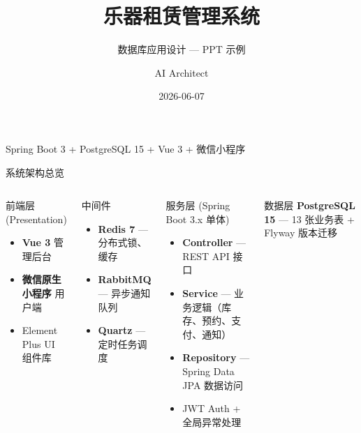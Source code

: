 \documentclass[aspectratio=169,10pt]{beamer}
\title{乐器租赁管理系统}
\subtitle{数据库应用设计 — PPT 示例}
\author{AI Architect}
\date{2026-06-07}
\newcommand{\pos}[1]{\textcolor{positive}{#1}}
\begin{document}
\begin{frame}
  \titlepage
  \vspace{-8pt}
  \begin{center}
    {\small Spring Boot 3 + PostgreSQL 15 + Vue 3 + 微信小程序}
  \end{center}
\end{frame}

\begin{frame}{系统架构总览}
  \vspace{4pt}
  \begin{columns}[T]
    \begin{block}{前端层 (Presentation)}
      \begin{itemize}
        \item \textbf{Vue 3} 管理后台
        \item \textbf{微信原生小程序} 用户端
        \item Element Plus UI 组件库
      \end{itemize}
    \end{block}
    \vspace{4pt}
    \begin{block}{中间件}
      \begin{itemize}
        \item \textbf{Redis 7} — 分布式锁、缓存
        \item \textbf{RabbitMQ} — 异步通知队列
        \item \textbf{Quartz} — 定时任务调度
      \end{itemize}
    \end{block}

    \begin{block}{服务层 (Spring Boot 3.x 单体)}
      \begin{itemize}
        \item \textbf{Controller} — REST API 接口
        \item \textbf{Service} — 业务逻辑（库存、预约、支付、通知）
        \item \textbf{Repository} — Spring Data JPA 数据访问
        \item \pos{JWT Auth + 全局异常处理}
      \end{itemize}
    \end{block}
    \vspace{4pt}
    \begin{block}{数据层}
      \textbf{PostgreSQL 15} — 13 张业务表 + Flyway 版本迁移
    \end{block}
  \end{columns}
\end{frame}
\end{document}

